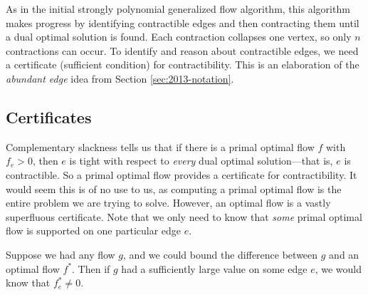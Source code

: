 \documentclass[11pt]{article}
\theoremstyle{definition}
\theoremstyle{definition}
\begin{document}
	
	
    
    As in the initial strongly polynomial generalized flow algorithm, this algorithm makes progress by
    identifying contractible edges and then contracting them until a dual optimal
    solution is found. Each contraction collapses one vertex, so only $n$ contractions
    can occur. To identify and reason about contractible edges, we need a certificate
    (sufficient condition) for contractibility. This is an elaboration of the \emph{abundant edge}
    idea from Section \ref{sec:2013-notation}.

	\subsection{Certificates}\label{sec:cert}
    
	Complementary slackness tells us that if there is a primal optimal flow $f$ with
	$f_e > 0$, then $e$ is tight with respect to \emph{every} dual optimal solution---that
	is, $e$ is contractible. So a primal optimal flow provides a certificate for contractibility.
	It would seem this is of no use to us, as computing a primal optimal flow is the entire
	problem we are trying to solve. However, an optimal flow is a vastly superfluous certificate.
	Note that we only need to know that \emph{some}
	primal optimal flow is supported on one particular edge $e$.
	
	Suppose we had any flow $g$, and we could bound the difference between $g$ and an optimal
	flow $f^*$. Then if $g$ had a sufficiently large value on some edge $e$, we would know that
	$f^*_e \neq 0$.
    
\end{document}
